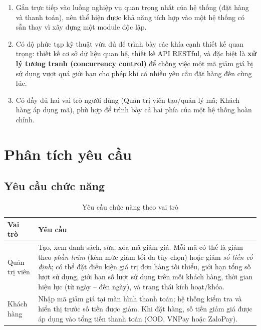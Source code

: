 \documentclass[12pt,a4paper]{article}
\begin{document}
\begin{enumerate}[leftmargin=*]
    \item Gắn trực tiếp vào luồng nghiệp vụ quan trọng nhất của hệ thống (đặt hàng và thanh toán), nên thể hiện được khả năng tích hợp vào một hệ thống có sẵn thay vì xây dựng một module độc lập.
    \item Có độ phức tạp kỹ thuật vừa đủ để trình bày các khía cạnh thiết kế quan trọng: thiết kế cơ sở dữ liệu quan hệ, thiết kế API RESTful, và đặc biệt là \textbf{xử lý tương tranh (concurrency control)} để chống việc một mã giảm giá bị sử dụng vượt quá giới hạn cho phép khi có nhiều yêu cầu đặt hàng đến cùng lúc.
    \item Có đầy đủ hai vai trò người dùng (Quản trị viên tạo/quản lý mã; Khách hàng áp dụng mã), phù hợp để trình bày cả hai phía của một hệ thống hoàn chỉnh.
\end{enumerate}

\section{Phân tích yêu cầu}

\subsection{Yêu cầu chức năng}

\begin{table}[H]
\centering
\begin{tabular}{@{}p{3cm}p{10.5cm}@{}}
\toprule
\textbf{Vai trò} & \textbf{Yêu cầu} \\
\midrule
Quản trị viên &
Tạo, xem danh sách, sửa, xóa mã giảm giá. Mỗi mã có thể là giảm theo \textit{phần trăm} (kèm mức giảm tối đa tùy chọn) hoặc giảm \textit{số tiền cố định}; có thể đặt điều kiện giá trị đơn hàng tối thiểu, giới hạn tổng số lượt sử dụng, giới hạn số lượt sử dụng trên mỗi khách hàng, thời gian hiệu lực (từ ngày -- đến ngày), và trạng thái kích hoạt/khóa. \\
\addlinespace
Khách hàng &
Nhập mã giảm giá tại màn hình thanh toán; hệ thống kiểm tra và hiển thị trước số tiền được giảm. Khi đặt hàng, số tiền giảm giá được áp dụng vào tổng tiền thanh toán (COD, VNPay hoặc ZaloPay). \\
\bottomrule
\end{tabular}
\caption{Yêu cầu chức năng theo vai trò}
\end{table}
\end{document}
